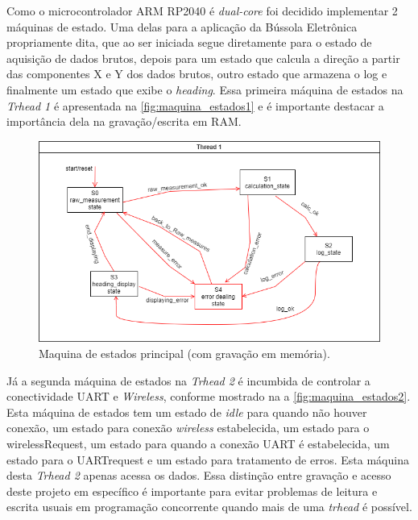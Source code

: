 \documentclass[10pt,twocolumn,letterpaper]{article}
\begin{document}
Como o microcontrolador ARM RP2040 \cite{RP2040_Datasheet} é \emph{dual-core} foi decidido implementar 2 máquinas de estado. Uma 
delas para a aplicação da Bússola Eletrônica propriamente dita, que ao ser iniciada segue diretamente para o estado de aquisição 
de dados brutos, depois para um estado que calcula a direção a partir das componentes X e Y dos dados brutos, outro estado que 
armazena o log e finalmente um estado que exibe o \emph{heading}. Essa primeira máquina de estados na \emph{Trhead 1} é apresentada
na \autoref{fig:maquina_estados1} e é importante destacar a importância dela na gravação/escrita em RAM.
\begin{figure}[h]
  \centering
  \includegraphics[width=\linewidth]{figures/maquina_estados1.png}
  \caption{Maquina de estados principal (com gravação em memória).}
  \label{fig:maquina_estados1}
\end{figure}
Já a segunda máquina de estados na \emph{Trhead 2} é incumbida de controlar a conectividade UART e \emph{Wireless}, conforme mostrado 
na a \autoref{fig:maquina_estados2}. Esta máquina de estados tem um estado de \emph{idle} para quando não houver conexão, um estado 
para conexão \emph{wireless} estabelecida, um estado para o wirelessRequest, um estado para quando a conexão UART é estabelecida, um 
estado para o UARTrequest e um estado para tratamento de erros. Esta máquina desta \emph{Trhead 2} apenas acessa os dados. Essa 
distinção entre gravação e acesso deste projeto em específico é importante para evitar problemas de leitura e escrita usuais em 
programação concorrente quando mais de uma \emph{trhead} é possível.
\end{document}
